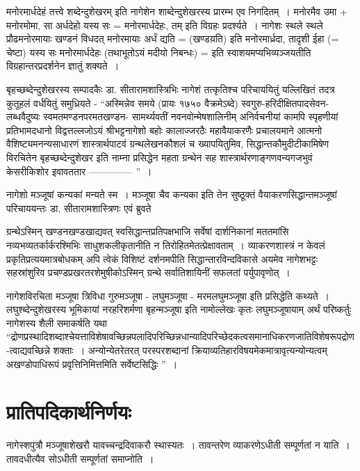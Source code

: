 {मनोरमार्धदेहं तत्त्वे शब्देन्दुशेखरम् इति नागेशेन शाब्देन्दुशेखरस्य प्रारम्भ एव निगदितम्~। मनोरमैव उमा + मनोरमोमा, सा अर्धदेहो यस्य सः = मनोरमार्धदेहः, तम् इति विग्रहः प्रदर्श्यते~। नागेशः स्थले स्थले प्रौढमनोरमायाः खण्डनं विधदत् मनोरमायाः अर्धं द्यति = (खण्डय़ति) इति मनोरमार्ध्रदा, तादृशी ईहा (= चेष्टा) यस्य सः मनोरमार्धदेहः (तथाभूतोऽयं मदीयो निबन्धः) = इति स्वाशयमप्यभिव्यञ्जयतीति विग्रहान्तरप्रदर्शनेन ज्ञातुं शक्यते~। 

बृहच्छब्देन्दुशेखरस्य सम्पादकैः डा. सीतारामशास्त्रिभिः नागेशं तत्कृतिश्च परिचाययितुं यल्लिखितं तदत्र कुतूहलं वर्धयितुं समुध्रियते - “अस्मिन्नेव समये (प्रायः १७५० वैक्रमेऽब्दे) स्वगुरु-हरिदीक्षितपादसेवन-लब्धवैदुष्यः स्वमतमण्डनपरमतखण्डन- सामर्थ्यवतीं नवनवोन्मेषशालिनीम् अनिर्वचनीयां कामपि स्पृहणीयां प्रतिभामदधानो विद्वत्तल्लजोऽयं श्रीभट्टनागेशो बहोः कालाज्जरठैः महावैयाकरणैः प्रचालयमाने आत्मनो वैशिष्ट्यमनन्यसाधारणं शास्त्रार्थपाटवं ग्रन्थलेखनकौशलं च ख्यापयितुमिव, सिद्धान्तकौमुदीटीकामिषेण विरचितेन बृहच्छब्देन्दुशेखर इति नाम्ना प्रसिद्धेन महता ग्रन्थेन सह शास्त्रार्थरणाङ्गणवन्यगजभुवं केसरीकिशोर इवावततार -------------- ”~। 

नागेशो मञ्जूषां कन्यकां मन्यते स्म~। मञ्जूषा चैव कन्यका इति तेन सुष्ठूक्तं वैयाकरणसिद्धान्तमञ्जूषां परिचाययन्तः डा. सीतारामशास्त्रिणः एवं ब्रुवते 

ग्रन्थेऽस्मिन् खण्डनखण्डखाद्यवत् स्वसिद्धान्तप्रतिपक्षभाजि सर्वेषां दार्शनिकानां मततमांसि नव्यभव्यतर्कार्करश्मिभिः साधुशकलीकृतानीति न तिरोहितमेतत्प्रेक्षावताम्~। व्याकरणशास्त्रं न केवलं प्रकृतिप्रत्ययमात्रबोधकम् अपि त्वेकं विशिष्टं दर्शनमपीति सिद्धान्तारविन्दविकासे अयमेव नागेशभट्टः सहस्रांशुरिव प्रचण्डप्रखरतरशेमुषीकोऽस्मिन् ग्रन्थे सर्वातिशायिनीं सफलतां पर्युपावृणोत्~। 

नागेशविरचिता मञ्जूषा त्रिविधा  गुरुमञ्जूषा - लघुमञ्जूषा - मरमलघुमञ्जूषा इति प्रसिद्धेति कथ्यते~। लघुश्ब्देन्दुशेखरस्य भूमिकायां नरहरिशर्मणा बृहन्मञ्जूषा इति नामोल्लेखः कृतः लघुमञ्जूषायाम् अर्थं परिष्कर्तुः नागेशस्य शैली समाकर्षति यथा  “द्रोणप्रस्थादिशब्दाश्चेयत्ता\-विशेषावच्छिन्नपलादिपरिच्छिन्नधान्यादिपरिच्छेदकत्वसमानाधिकरणजातिविशेषरूपद्रोण-\break त्वाद्यवच्छिन्ने शक्ताः~। अन्योन्येतरेतरत् परस्परशब्दानां क्रियाव्यतिहारविषयमेकमात्रावृत्यन्योन्यत्वम् अखण्डोपाधिरूपं प्रवृत्तिनिमित्तमिति सर्वेष्टसिद्धिः ”~। 

\section*{प्रातिपदिकार्थनिर्णयः}

नागेस्शपुत्रौ मञ्जूषाशेखरौ यावच्चन्द्रदिवाकरौ स्थास्यतः~। तावन्तरेण व्याकरणेऽधीती सम्पूर्णतां न याति~। तावदधीत्यैव सोऽधीती सम्पूर्णतां समाप्नोति~। 

\articleend
}
